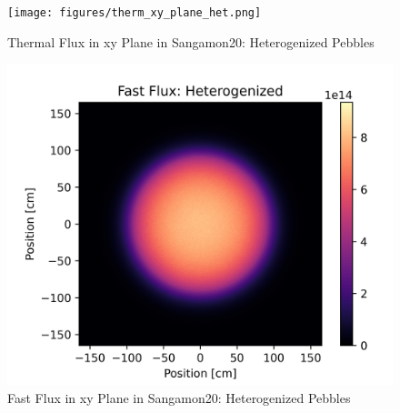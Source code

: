 \begin{figure}[H]
\centering

\texttt{[image: figures/therm\_xy\_plane\_het.png]}
\caption{Thermal Flux in xy Plane in Sangamon20: Heterogenized Pebbles}
\label{fig:het-plane-therm}

\end{figure}

\begin{figure}[H]
\centering

\includegraphics[width=1.0\linewidth]{figures/fast_xy_plane_het.png}
\caption{Fast Flux in xy Plane in Sangamon20: Heterogenized Pebbles}
\label{fig:het-plane-fast}

\end{figure}